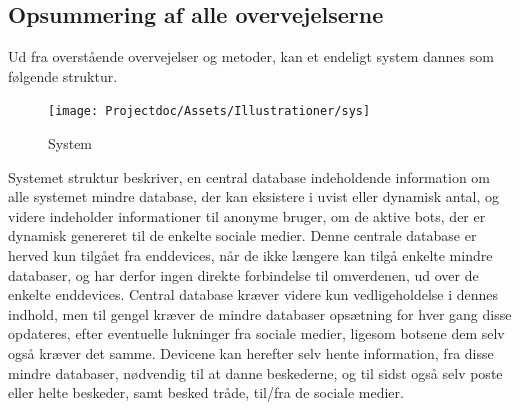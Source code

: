



\subsection{Opsummering af alle overvejelserne}
Ud fra overstående overvejelser og metoder, kan et endeligt system dannes som følgende struktur.

\begin{figure}[H]
    \centering
    \texttt{[image: Projectdoc/Assets/Illustrationer/sys]}
    \caption{System}
    \label{fig:sysdiagram}
\end{figure}

Systemet struktur beskriver, en central database indeholdende information om alle systemet mindre database, der kan eksistere i uvist eller dynamisk antal, og videre indeholder informationer til anonyme bruger, om de aktive bots, der er dynamisk genereret til de enkelte sociale medier.
Denne centrale database er herved kun tilgået fra enddevices, når de ikke længere kan tilgå enkelte mindre databaser, og har derfor ingen direkte forbindelse til omverdenen, ud over de enkelte enddevices. Central database kræver videre kun vedligeholdelse i dennes indhold, men til gengel kræver de mindre databaser opsætning for hver gang disse opdateres, efter eventuelle lukninger fra sociale medier, ligesom botsene dem selv også kræver det samme.
Devicene kan herefter selv hente information, fra disse mindre databaser, nødvendig til at danne beskederne, og til sidst også selv poste eller helte beskeder, samt besked tråde, til/fra de sociale medier.



